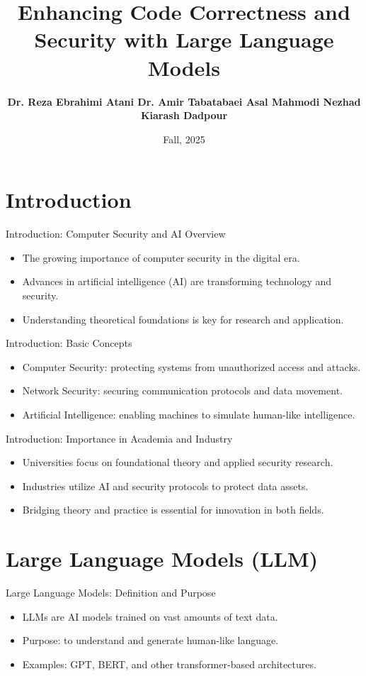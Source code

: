 \documentclass[t,ignorenonframetext]{beamer}
\title[Security & AI Overview]{Enhancing Code Correctness and Security with Large Language Models}
\author[University of Guilan]
{\textbf{Dr. Reza Ebrahimi Atani \newline Dr. Amir Tabatabaei \newline Asal Mahmodi Nezhad \newline Kiarash Dadpour}}
\date{Fall, 2025}
\begin{document}
\frame{\maketitle}

\section{Introduction}
\begin{frame}{Introduction: Computer Security and AI Overview}
\begin{itemize}
\item The growing importance of computer security in the digital era.
\item Advances in artificial intelligence (AI) are transforming technology and security.
\item Understanding theoretical foundations is key for research and application.
\end{itemize}
\end{frame}

\begin{frame}{Introduction: Basic Concepts}
\begin{itemize}
\item Computer Security: protecting systems from unauthorized access and attacks.
\item Network Security: securing communication protocols and data movement.
\item Artificial Intelligence: enabling machines to simulate human-like intelligence.
\end{itemize}
\end{frame}

\begin{frame}{Introduction: Importance in Academia and Industry}
\begin{itemize}
\item Universities focus on foundational theory and applied security research.
\item Industries utilize AI and security protocols to protect data assets.
\item Bridging theory and practice is essential for innovation in both fields.
\end{itemize}
\end{frame}

\section{Large Language Models (LLM)}
\begin{frame}{Large Language Models: Definition and Purpose}
\begin{itemize}
\item LLMs are AI models trained on vast amounts of text data.
\item Purpose: to understand and generate human-like language.
\item Examples: GPT, BERT, and other transformer-based architectures.
\end{itemize}
\end{frame}
\end{document}
